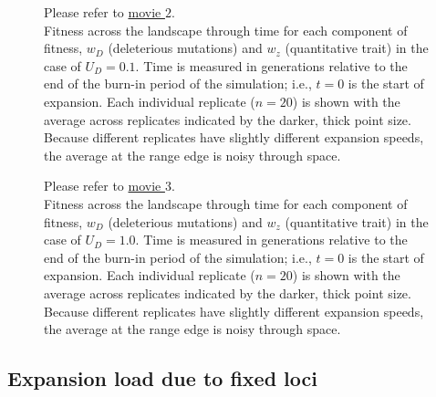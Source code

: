 \begin{figure}[h!]
\caption[ ~ - Fitness across the landscape through time for each component of fitness for $U_D = 0.1$.]{Please refer to \href{http://www.zoology.ubc.ca/~kgilbert/PopFitness_U0p1.mp4}{movie $2$}. \\ Fitness across the landscape through time for each component of fitness, $w_D$ (deleterious mutations) and $w_z$ (quantitative trait) in the case of $U_D = 0.1$. Time is measured in generations relative to the end of the burn-in period of the simulation; i.e., $t = 0$ is the start of expansion. Each individual replicate ($n = 20$) is shown with the average across replicates indicated by the darker, thick point size. Because different replicates have slightly different expansion speeds, the average at the range edge is noisy through space.}
\label{fig:fitmov2}
\end{figure}

\begin{figure}[h!]
\caption[ ~ - Fitness across the landscape through time for each component of fitness for $U_D = 1.0$.]{Please refer to \href{http://www.zoology.ubc.ca/~kgilbert/PopFitness_U1.mp4}{movie $3$}. \\ Fitness across the landscape through time for each component of fitness, $w_D$ (deleterious mutations) and $w_z$ (quantitative trait) in the case of $U_D = 1.0$. Time is measured in generations relative to the end of the burn-in period of the simulation; i.e., $t = 0$ is the start of expansion. Each individual replicate ($n = 20$) is shown with the average across replicates indicated by the darker, thick point size. Because different replicates have slightly different expansion speeds, the average at the range edge is noisy through space.}
\label{fig:fitmov3}
\end{figure}


\newpage{}


\subsection{Expansion load due to fixed loci}



